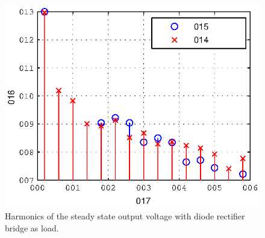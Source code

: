 \documentclass[conference,10pt]{IEEEtran}
\begin{document}
\begin{figure}[!h]
\centering

\includegraphics{fig/steady_state_harmonics}
\caption{Harmonics of the steady state output voltage with diode rectifier bridge as load.}
\label{fig:ss_harm}
\end{figure}



\end{document}
